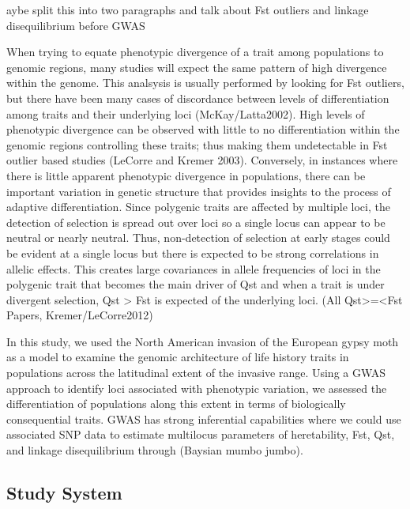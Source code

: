 \documentclass[fleqn,11pt]{wlpeerj}
\begin{document}
^^Maybe split this into two paragraphs and talk about Fst outliers and linkage disequilibrium before GWAS

When trying to equate phenotypic divergence of a trait among populations to genomic regions, many studies will expect the same pattern of high divergence within the genome. This analsysis is usually performed by looking for Fst outliers, but there have been many cases of discordance between levels of differentiation among traits and their underlying loci (McKay/Latta2002).  High levels of phenotypic divergence can be observed with little to no differentiation within the genomic regions controlling these traits; thus making them undetectable in Fst outlier based studies (LeCorre and Kremer 2003).  Conversely, in instances where there is little apparent phenotypic divergence in populations, there can be important variation in genetic structure that provides insights to the process of adaptive differentiation. Since polygenic traits are affected by multiple loci, the detection of selection is spread out over loci so a single locus can appear to be neutral or nearly neutral. Thus, non-detection of selection at early stages could be evident at a single locus but there is expected to be strong correlations in allelic effects. This creates large covariances in allele frequencies of loci in the polygenic trait that becomes the main driver of Qst and when a trait is under divergent selection, Qst > Fst is expected of the underlying loci. (All Qst>=<Fst Papers, Kremer/LeCorre2012)

In this study, we used the North American invasion of the European gypsy moth as a model to examine the genomic architecture of life history traits in populations across the latitudinal extent of the invasive range.  Using a GWAS approach to identify loci associated with phenotypic variation, we assessed the differentiation of populations along this extent in terms of biologically consequential traits. GWAS has strong inferential capabilities where we could use associated SNP data to estimate multilocus parameters of heretability, Fst, Qst, and linkage disequilibrium through (Baysian mumbo jumbo). 

\subsection*{Study System}
\end{document}
